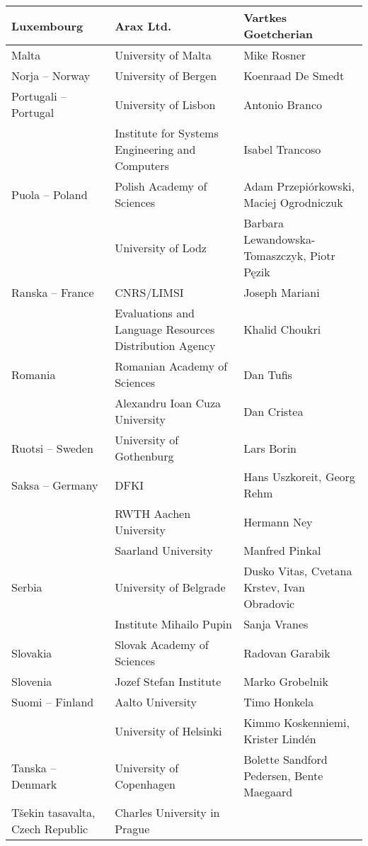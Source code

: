 \documentclass[]{../../metanetpaper}
\begin{document}
\begin{longtable}{p{3.5cm}|p{5.5cm}|p{5cm}}
 \\ \hline
 Luxembourg
 &  Arax Ltd.
 &  Vartkes Goetcherian
 \\ \hline
 Malta
 &  University of Malta
 &  Mike Rosner
 \\ \hline
 Norja -- Norway
 &  University of Bergen
 &  Koenraad De Smedt
 \\ \hline
 Portugali -- Portugal
 &  University of Lisbon
 &  Antonio Branco
 \\
 &  Institute for Systems      
    Engineering and Computers
 &  Isabel Trancoso
 \\ \hline
 Puola -- Poland
 &  Polish Academy of Sciences
 &  Adam Przepiórkowski,
    Maciej Ogrodniczuk
 \\
 &  University of Lodz
 &  Barbara Lewandowska-Tomaszczyk,
    Piotr Pęzik
 \\ \hline
 Ranska -- France
 &  CNRS/LIMSI
 &  Joseph Mariani
 \\
 &  \raggedright Evaluations and Language
    Resources Distribution Agency
 &  Khalid Choukri \\ \hline
 Romania
 &  Romanian Academy of Sciences
 &  Dan Tufis
 \\
 &  Alexandru Ioan Cuza University
 &  Dan Cristea
 \\ \hline
 Ruotsi -- Sweden
 &  University of Gothenburg
 &  Lars Borin
 \\ \hline
 Saksa -- Germany
 &  DFKI
 &  Hans Uszkoreit, Georg Rehm
 \\
 & RWTH Aachen University
 & Hermann Ney
 \\
 & Saarland University
 & Manfred Pinkal
 \\ \hline
 Serbia
 &  University of Belgrade
 &  Dusko Vitas,
    Cvetana Krstev,
    Ivan Obradovic
 \\
 &  Institute Mihailo Pupin
 &  Sanja Vranes
 \\ \hline
 Slovakia 
 &  Slovak Academy of Sciences
 &  Radovan Garabik
 \\ \hline
 Slovenia
 &  Jozef Stefan Institute
 &  Marko Grobelnik
 \\ \hline
 Suomi -- Finland
 & Aalto University
 & Timo Honkela
 \\
 & University of Helsinki
 & Kimmo Koskenniemi,
   Krister Lindén
 \\ \hline
 Tanska -- Denmark
 &  University of Copenhagen
 &  Bolette Sandford Pedersen,
    Bente Maegaard
 \\ \hline
 \raggedright
 Tšekin tasavalta, Czech Republic
 &  Charles University in Prague

\end{longtable}
\end{document}
